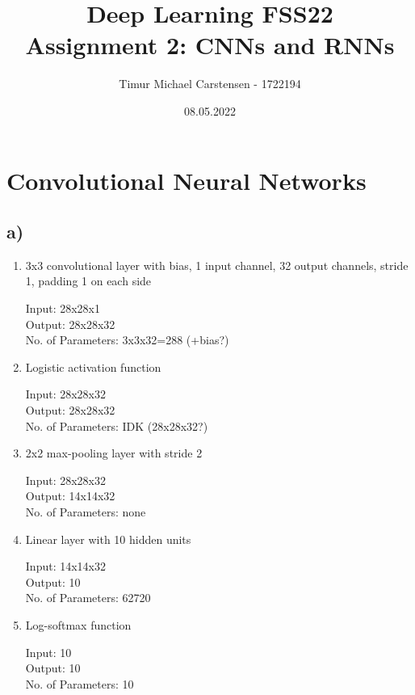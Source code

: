 \documentclass[11pt]{article}
\title{Deep Learning FSS22 \\ Assignment 2: CNNs and RNNs}
\author{Timur Michael Carstensen - 1722194}
\date{08.05.2022}
\begin{document}

\maketitle


\newpage

\tableofcontents

\newpage



\section{Convolutional Neural Networks}\label{sec:cnn}

\subsection{a)}\label{subsec:cnn-a}
\begin{enumerate}[label=(\roman*)]
\item 3x3 convolutional layer with bias, 1 input channel, 32 output channels, stride 1, padding 1 on each side 

Input: 28x28x1\\
Output: 28x28x32\\
No. of Parameters: 3x3x32=288 (+bias?)\\

\item Logistic activation function

Input: 28x28x32 \\
Output: 28x28x32 \\
No. of Parameters: IDK (28x28x32?)\\

\item 2x2 max-pooling layer with stride 2

Input: 28x28x32\\
Output: 14x14x32\\
No. of Parameters: none \\

\item Linear layer with 10 hidden units

Input: 14x14x32\\
Output: 10 \\
No. of Parameters: 62720 \\

\item Log-softmax function

Input: 10 \\
Output: 10 \\
No. of Parameters: 10 \\
\end{enumerate}
\end{document}
